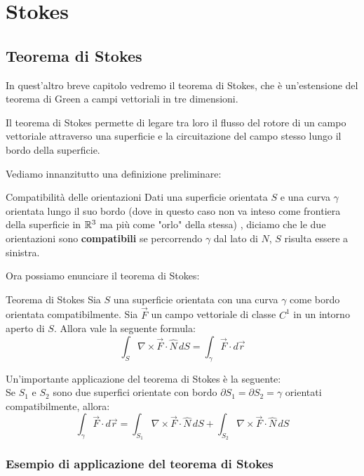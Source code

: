 \chapter{Stokes}
\section{Teorema di Stokes}
In quest'altro breve capitolo vedremo il teorema di Stokes, che è un'estensione del teorema di Green a campi vettoriali in tre dimensioni.

Il teorema di Stokes permette di legare tra loro il flusso del rotore di un campo vettoriale attraverso una superficie e la circuitazione del campo stesso lungo il bordo della superficie.

Vediamo innanzitutto una definizione preliminare:\\


\begin{definizione}{Compatibilità delle orientazioni}
  Dati una superficie orientata $ S $ e una curva $\gamma$ orientata lungo il suo bordo (dove in questo caso non va inteso come frontiera della superficie in $\mathbb{R}^3$ ma più come "orlo" della stessa) , diciamo che le due orientazioni sono \textbf{compatibili} se percorrendo $\gamma$ dal lato di $N$, $S$ risulta essere a sinistra.
\end{definizione}

Ora possiamo enunciare il teorema di Stokes:
\begin{teorema}{Teorema di Stokes}
    Sia $ S $ una superficie orientata con una curva $\gamma$ come bordo orientata compatibilmente. Sia $ \vec{F} $ un campo vettoriale di classe $ C^1 $ in un intorno aperto di $ S $. Allora vale la seguente formula:
    \[
        \int_S \nabla \times \vec{F} \cdot \hat{N} \, dS = \int_{\gamma} \vec{F} \cdot d\vec{r}
    \]
\end{teorema}

Un'importante applicazione del teorema di Stokes è la seguente:\\
Se $S_1$ e $S_2$ sono due superfici orientate con bordo $\partial S_1=\partial S_2 =\gamma$ orientati compatibilmente, allora:
\[
    \int_{\gamma} \vec{F} \cdot d\vec{r}=
\int_{S_1} \nabla \times \vec{F} \cdot \hat{N} \, dS + \int_{S_2} \nabla \times \vec{F} \cdot \hat{N} \, dS
\]

\subsection{Esempio di applicazione del teorema di Stokes}

